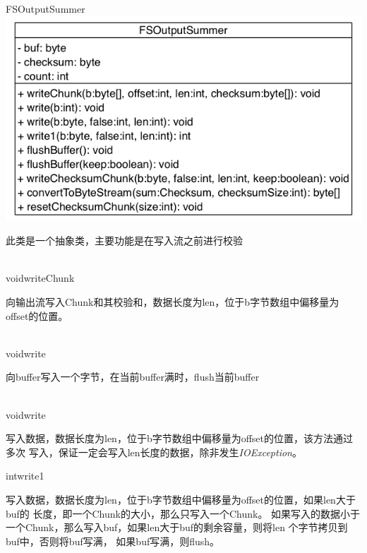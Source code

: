 \begin{XeClass}{FSOutputSummer}
\includegraphics[width=\textwidth]{cdig/FSOutputSummer.png}
     
 此类是一个抽象类，主要功能是在写入流之前进行校验

    \begin{XeMethod}{\XeProtected \\ \XeAbstract}{void}{writeChunk}
         
 向输出流写入Chunk和其校验和，数据长度为len，位于b字节数组中偏移量为offset的位置。

    \end{XeMethod}

    \begin{XeMethod}{\XePublic \\ \XeSync}{void}{write}
         
 向buffer写入一个字节，在当前buffer满时，flush当前buffer

    \end{XeMethod}

    \begin{XeMethod}{\XePublic \\ \XeSync}{void}{write}
         
 写入数据，数据长度为len，位于b字节数组中偏移量为offset的位置，该方法通过多次
 写入，保证一定会写入len长度的数据，除非发生\emph{IOException}。

    \end{XeMethod}

    \begin{XeMethod}{\XePrivate}{int}{write1}
         
 写入数据，数据长度为len，位于b字节数组中偏移量为offset的位置，如果len大于buf的
 长度，即一个Chunk的大小，那么只写入一个Chunk。
 如果写入的数据小于一个Chunk，那么写入buf，如果len大于buf的剩余容量，则将len
 个字节拷贝到buf中，否则将buf写满，
 如果buf写满，则flush。


\end{XeMethod}
\end{XeClass}
